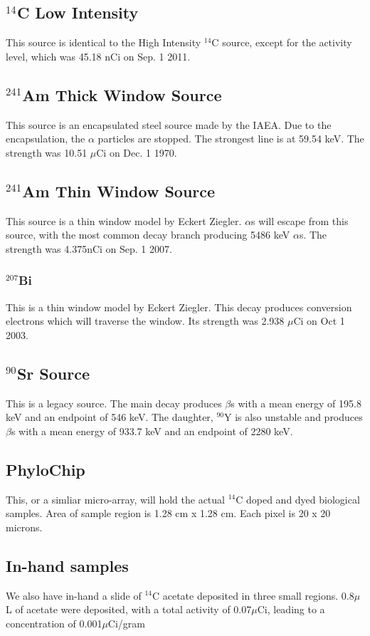 \documentclass[11pt]{article}
\newcommand{\nuc}[2]{\ensuremath{^{#1}}#2}
\begin{document}
\subsection{\nuc{14}{C} Low Intensity}
This source is identical to the High Intensity \nuc{14}{C} source, except for the activity level, which was 45.18 nCi on Sep. 1 2011.
\subsection{\nuc{241}{Am} Thick Window Source}
This source is an encapsulated steel source made by the IAEA. Due to the encapsulation, the $\alpha$ particles are stopped. The strongest line is at 59.54 keV. The strength was 10.51 $\mu$Ci on Dec. 1 1970.
\subsection{\nuc{241}{Am} Thin Window Source}
This source is a thin window model by Eckert Ziegler. $\alpha$s will escape from this source, with the most common decay branch producing 5486 keV $\alpha$s. The strength was 4.375nCi on Sep. 1 2007.
\subsubsection{\nuc{207}{Bi}}
This is a thin window model by Eckert Ziegler. This decay produces conversion electrons which will traverse the window. Its strength was 2.938 $\mu$Ci on Oct 1 2003.
\subsection{\nuc{90}{Sr} Source }
This is a legacy source. The main decay produces $\beta$s with a mean energy of 195.8 keV and an endpoint of 546 keV. The daughter, \nuc{90}{Y} is also unstable and produces $\beta$s with a mean energy of 933.7 keV and an endpoint of  2280 keV.
\subsection{PhyloChip}\label{sec:phyla} 
This, or a simliar micro-array, will hold the actual \nuc{14}{C} doped and dyed biological samples.
Area of sample region is 1.28 cm x 1.28 cm. Each pixel is 20 x 20 microns.
\subsection{In-hand samples}
We also have in-hand a slide of \nuc{14}{C} acetate deposited in three small regions. 0.8$\mu$L of acetate were deposited, with a total activity of 0.07$\mu$Ci, leading to a concentration of 0.001$\mu$Ci/gram
\end{document}
